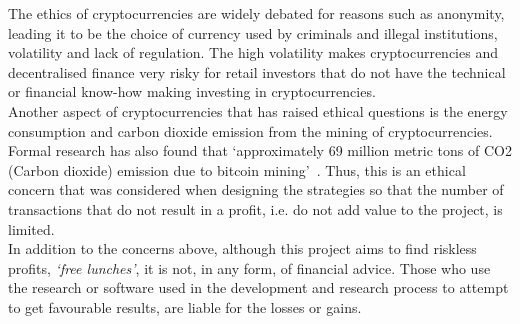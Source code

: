The ethics of cryptocurrencies are widely debated for reasons such as anonymity, leading it to be the choice of currency used by criminals and illegal institutions, volatility and lack of regulation. The high volatility makes cryptocurrencies and decentralised finance very risky for retail investors that do not have the technical or financial know-how making investing in cryptocurrencies.
\\[3mm]
Another aspect of cryptocurrencies that has raised ethical questions is the energy consumption and carbon dioxide emission from the mining of cryptocurrencies. Formal research has also found that `approximately 69 million metric tons of CO2 (Carbon dioxide) emission due to bitcoin mining'~\cite{egiyi2020cryptocurrency}. Thus, this is an ethical concern that was considered when designing the strategies so that the number of transactions that do not result in a profit, i.e. do not add value to the project, is limited.
\\[3mm]
In addition to the concerns above, although this project aims to find riskless profits, \textit{`free lunches'}, it is not, in any form, of financial advice. Those who use the research or software used in the development and research process to attempt to get favourable results, are liable for the losses or gains. 
